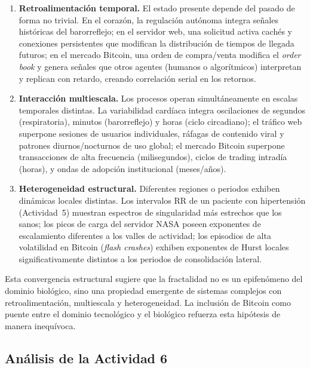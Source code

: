 \begin{enumerate}[leftmargin=2em]
    \item \textbf{Retroalimentación temporal.} El estado presente depende del
          pasado de forma no trivial. En el corazón, la regulación autónoma
          integra señales históricas del barorreflejo; en el servidor web, una
          solicitud activa cachés y conexiones persistentes que modifican la
          distribución de tiempos de llegada futuros; en el mercado Bitcoin,
          una orden de compra/venta modifica el \textit{order book} y genera
          señales que otros agentes (humanos o algorítmicos) interpretan y
          replican con retardo, creando correlación serial en los retornos.
    \item \textbf{Interacción multiescala.} Los procesos operan simultáneamente
          en escalas temporales distintas. La variabilidad cardíaca integra
          oscilaciones de segundos (respiratoria), minutos (barorreflejo) y
          horas (ciclo circadiano); el tráfico web superpone sesiones de
          usuarios individuales, ráfagas de contenido viral y patrones
          diurnos/nocturnos de uso global; el mercado Bitcoin superpone
          transacciones de alta frecuencia (milisegundos), ciclos de trading
          intradía (horas), y ondas de adopción institucional (meses/años).
    \item \textbf{Heterogeneidad estructural.} Diferentes regiones o periodos
          exhiben dinámicas locales distintas. Los intervalos RR de un paciente
          con hipertensión (Actividad~5) muestran espectros de singularidad más
          estrechos que los sanos; los picos de carga del servidor NASA poseen
          exponentes de escalamiento diferentes a los valles de actividad;
          los episodios de alta volatilidad en Bitcoin (\textit{flash crashes})
          exhiben exponentes de Hurst locales significativamente distintos a
          los periodos de consolidación lateral.
\end{enumerate}

Esta convergencia estructural sugiere que la fractalidad no es un epifenómeno
del dominio biológico, sino una propiedad emergente de sistemas complejos con
retroalimentación, multiescala y heterogeneidad. La inclusión de Bitcoin como
puente entre el dominio tecnológico y el biológico refuerza esta hipótesis de
manera inequívoca.

\subsection{Análisis de la Actividad 6}

